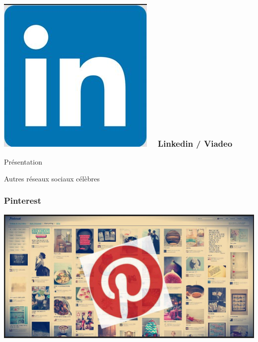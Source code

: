 \documentclass{beamer}
\begin{document}
\begin{frame}
\frametitle{\includegraphics[scale=0.15] {./images/linkedin_logo.jpg} ~ Linkedin / Viadeo}
\begin{block}{Présentation}
\begin{itemize}
\end{itemize}
\end{block}
\end{frame}

\begin{frame}
\begin{center}
\Huge{Autres réseaux sociaux célèbres}
\end{center}
\end{frame}

\begin{frame}
\frametitle{Pinterest}
\begin{center}
\includegraphics[scale=0.6] {./images/pinterest.jpg} 
\end{center}
\end{frame}
\end{document}
